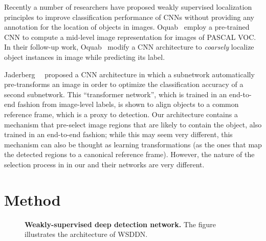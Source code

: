 \documentclass[10pt,twocolumn,letterpaper]{article}
\begin{document}
Recently a number of researchers \cite{Oquab14,Oquab15} have proposed weakly supervised localization principles to improve classification performance of CNNs without providing any annotation for the location of objects in images. Oquab~\etal \cite{Oquab14} employ a pre-trained CNN to compute a mid-level image representation for images of PASCAL VOC. In their follow-up work, Oquab~\etal \cite{Oquab15} modify a CNN architecture to \emph{coarsely} localize object instances in image while predicting its label. 

Jaderberg~\etal~\cite{Jaderberg15c} proposed a CNN architecture in which a subnetwork automatically pre-transforms an image in order to optimize the classification accuracy of a second subnetwork. This ``transformer network'', which is trained in an end-to-end fashion from image-level labels, is shown to align objects to a common reference frame, which is a proxy to detection. Our architecture contains a mechanism that pre-select image regions that are likely to contain the object, also trained in an end-to-end fashion; while this may seem very different, this mechanism can also be thought as learning transformations (as the ones that map the detected regions to a canonical reference frame). However, the nature of the selection process in in our and their networks are very different.
 
\section{Method}\label{s:method}
 \begin{figure*}[th]
\begin{center}
\footnotesize
{}
\end{center}
\label{f:WSDDN}
\caption{{\bf Weakly-supervised deep detection network.} The figure illustrates the architecture of WSDDN.}
\end{figure*}
\end{document}
